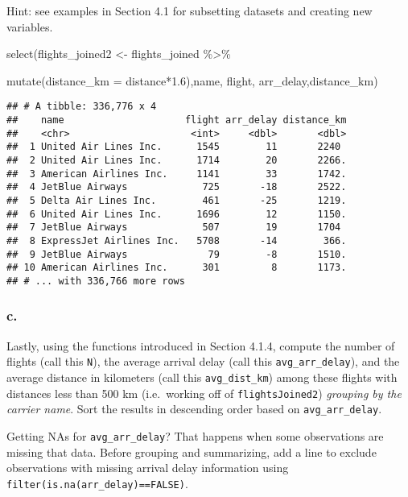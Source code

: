 \documentclass[
]{article}
\newenvironment{Shaded}{\begin{snugshade}}{\end{snugshade}}
\newcommand{\AttributeTok}[1]{\textcolor[rgb]{0.77,0.63,0.00}{#1}}
\newcommand{\FloatTok}[1]{\textcolor[rgb]{0.00,0.00,0.81}{#1}}
\newcommand{\FunctionTok}[1]{\textcolor[rgb]{0.00,0.00,0.00}{#1}}
\newcommand{\NormalTok}[1]{#1}
\newcommand{\OtherTok}[1]{\textcolor[rgb]{0.56,0.35,0.01}{#1}}
\newcommand{\SpecialCharTok}[1]{\textcolor[rgb]{0.00,0.00,0.00}{#1}}
\begin{document}
Hint: see examples in Section 4.1 for subsetting datasets and creating
new variables.

\begin{Shaded}
\begin{Highlighting}[]
\FunctionTok{select}\NormalTok{(flights\_joined2 }\OtherTok{\textless{}{-}}\NormalTok{ flights\_joined }\SpecialCharTok{\%\textgreater{}\%} 
  
  \FunctionTok{mutate}\NormalTok{(}\AttributeTok{distance\_km =}\NormalTok{ distance}\SpecialCharTok{*}\FloatTok{1.6}\NormalTok{),name, flight, arr\_delay,distance\_km) }
\end{Highlighting}
\end{Shaded}

\begin{verbatim}
## # A tibble: 336,776 x 4
##    name                     flight arr_delay distance_km
##    <chr>                     <int>     <dbl>       <dbl>
##  1 United Air Lines Inc.      1545        11       2240 
##  2 United Air Lines Inc.      1714        20       2266.
##  3 American Airlines Inc.     1141        33       1742.
##  4 JetBlue Airways             725       -18       2522.
##  5 Delta Air Lines Inc.        461       -25       1219.
##  6 United Air Lines Inc.      1696        12       1150.
##  7 JetBlue Airways             507        19       1704 
##  8 ExpressJet Airlines Inc.   5708       -14        366.
##  9 JetBlue Airways              79        -8       1510.
## 10 American Airlines Inc.      301         8       1173.
## # ... with 336,766 more rows
\end{verbatim}

\hypertarget{c.}{%
\subsubsection{c.}\label{c.}}

Lastly, using the functions introduced in Section 4.1.4, compute the
number of flights (call this \texttt{N}), the average arrival delay
(call this \texttt{avg\_arr\_delay}), and the average distance in
kilometers (call this \texttt{avg\_dist\_km}) among these flights with
distances less than 500 km (i.e.~working off of \texttt{flightsJoined2})
\emph{grouping by the carrier name}. Sort the results in descending
order based on \texttt{avg\_arr\_delay}.

Getting NAs for \texttt{avg\_arr\_delay}? That happens when some
observations are missing that data. Before grouping and summarizing, add
a line to exclude observations with missing arrival delay information
using \texttt{filter(is.na(arr\_delay)==FALSE)}.
\end{document}
